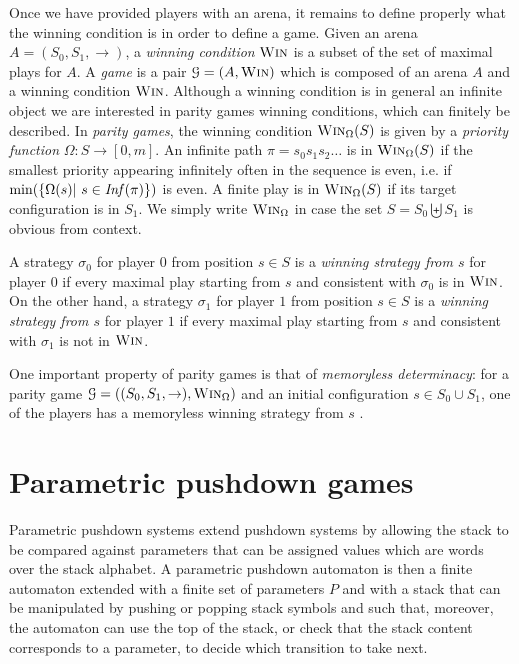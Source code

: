 \documentclass[a4paper,UKenglish,cleveref, autoref, thm-restate]{lipics-v2021}
\newcommand{\win}{\textsc{Win}}
\begin{document}
Once we have provided players with an arena, it remains to define  properly what the winning condition is in order to define a game. Given an arena $A = (S_0, S_1, \rightarrow)$, a {\em winning condition}
$\win$
is a subset  
of the set of maximal plays for $A$. A {\em game} is a pair $\mathcal{G}= (A, \win)$ which is composed of an arena $A$ and a winning condition $\win$.
Although a winning condition is in general an infinite object we are interested in parity games winning conditions, 
which can finitely be described. In 
{\em parity games},
the winning condition $\win_\Omega(S)$ is given by a {\em priority function} 
 $\Omega : S \to  [0, m]$.
An infinite path $ \pi = s_0 s_1 s_2 \ldots$ is in $\win_\Omega(S)$ if the smallest priority appearing infinitely often in
the sequence 
 is even, i.e.
if $\min( \{ \Omega(s) | ~ s \in \text{\textit{Inf}}( \pi) \})$ is even.  
A finite play is in $\win_\Omega(S)$ if its target configuration is in $S_1$.
We simply write
$\win_\Omega$ in case the set $S = S_0 \biguplus S_1$ is obvious from context.

A strategy $\sigma_0$ for player $0$ from position $s \in S$ is a {\em winning strategy
 from $s$} for player $0$ if 
every maximal play starting from $s$ and consistent with $\sigma_0$ is in $\win$.
On the other hand, a strategy $\sigma_1$ for player $1$ from position $s \in S$ is a {\em winning strategy
 from $s$} for player $1$ if 
every maximal play starting from $s$ and consistent with $\sigma_1$ is not in $\win$.
 













One important property of parity games is that of {\em memoryless determinacy}: for a parity game
$\mathcal{G}= ((S_0,S_1,\rightarrow),\win_\Omega) $ and an initial configuration $s \in S_0 \cup S_1$, one of the players has a memoryless winning strategy from $s$ \cite{zielonka1998infinite}.



\section{Parametric pushdown games}



Parametric pushdown systems extend pushdown systems by allowing the stack to be compared against parameters that can be assigned values which are words over the stack alphabet.
A parametric pushdown automaton is then a finite automaton extended with a finite set of parameters $P$  and with a stack that can be manipulated by pushing or popping stack symbols and such that, moreover, the automaton can use the top of the stack, or check that the stack content corresponds to a parameter,  to decide which transition to take next.\\
\end{document}
